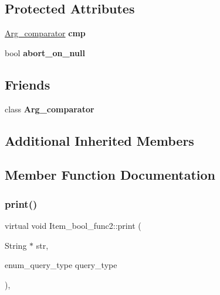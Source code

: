 \subsection*{Protected Attributes}
\begin{DoxyCompactItemize}
\item 
\mbox{\label{classItem__bool__func2_a4c84716be672a154b00c5696eb22a9aa}} 
\mbox{\hyperlink{classArg__comparator}{Arg\+\_\+comparator}} {\bfseries cmp}
\item 
\mbox{\label{classItem__bool__func2_a216a95337509688021db08316cb5b3e4}} 
bool {\bfseries abort\+\_\+on\+\_\+null}
\end{DoxyCompactItemize}
\subsection*{Friends}
\begin{DoxyCompactItemize}
\item 
\mbox{\label{classItem__bool__func2_aa7e000c9260190b57187f6bb3bb29d04}} 
class {\bfseries Arg\+\_\+comparator}
\end{DoxyCompactItemize}
\subsection*{Additional Inherited Members}


\subsection{Member Function Documentation}
\mbox{\label{classItem__bool__func2_a12469a240720c26bef325a4ee5b02f50}} 
\subsubsection{\texorpdfstring{print()}{print()}}
{\footnotesize\ttfamily virtual void Item\+\_\+bool\+\_\+func2\+::print (\begin{DoxyParamCaption}\item[{String $\ast$}]{str,  }\item[{enum\+\_\+query\+\_\+type}]{query\+\_\+type }\end{DoxyParamCaption})\hspace{0.3cm}{\ttfamily [inline]}, {\ttfamily [virtual]}}

